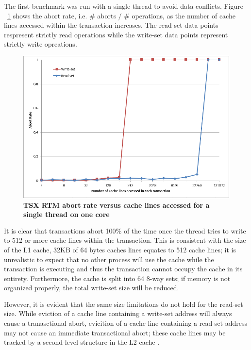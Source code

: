 \documentclass[a4paper]{article}
\begin{document}
\indent
The first benchmark was run with a single thread to avoid data conflicts.  Figure
~\ref{fig:trx_size} shows the abort rate, i.e. \# aborts / \# operations, as the
number of cache lines accessed within the transaction increases.  The read-set
data points respresent strictly read operations while the write-set data points
represent strictly write opreations.
\par 

\begin{figure}[H]
    \centering
    \graphicspath{ {./figures/} }
    \includegraphics[totalheight=0.50\textheight,keepaspectratio]{trx_size}
    \caption{\textbf{TSX RTM abort rate versus cache lines accessed for a single
    thread on one core}}
    \label{fig:trx_size}
\end{figure}

\indent
It is clear that transactions abort 100\% of the time once the thread tries to
write to 512 or more cache lines within the transaction.  This is consistent
with the size of the L1 cache, 32KB of 64 bytes caches lines equates to 512
cache lines; it is unrealistic to expect that no other process will use the
cache while the transaction is executing and thus the transaction cannot occupy
the cache in its entirety.  Furthermore, the cache is split into 64 8-way sets;
if memory is not organized properly, the total write-set size will be reduced.
\par

\indent 
However, it is evident that the same size limitations do not hold for
the read-set size.  While eviction of a cache line containing a write-set address will
always cause a tranasctional abort, evicition of a cache line containing a
read-set address may not cause an immediate transactional abort; these cache
lines may be tracked by a second-level structure in the L2 cache
\cite{intel_opt_man}.
\par
\end{document}
